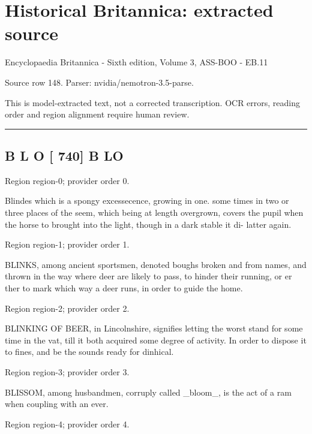 \documentclass[11pt]{article}
\begin{document}
\section*{Historical Britannica: extracted source}
Encyclopaedia Britannica - Sixth edition, Volume 3, ASS-BOO - EB.11\par
{\small Source row 148. Parser: nvidia/nemotron-3.5-parse.\par}
{\small This is model-extracted text, not a corrected transcription. OCR errors, reading order and region alignment require human review.\par}
\hrule\medskip
\subsection*{B L O [ 740] B LO}

{\scriptsize\color{gray} Region region-0; provider order 0.\par}
\medskip

Blindes which is a spongy excessecence, growing in one. some times in two or three places of the seem, which being at length overgrown, covers the pupil when the horse to brought into the light, though in a dark stable it di- latter again.
\par

{\scriptsize\color{gray} Region region-1; provider order 1.\par}
\medskip

BLINKS, among ancient sportsmen, denoted boughs broken and from names, and thrown in the way where deer are likely to pass, to hinder their running, or er ther to mark which way a deer runs, in order to guide the home.
\par

{\scriptsize\color{gray} Region region-2; provider order 2.\par}
\medskip

BLINKING OF BEER, in Lincolnshire, signifies letting the worst stand for some time in the vat, till it both acquired some degree of activity. In order to dispose it to fines, and be the sounds ready for dinhical.
\par

{\scriptsize\color{gray} Region region-3; provider order 3.\par}
\medskip

BLISSOM, among husbandmen, corruply called \_bloom\_, is the act of a ram when coupling with an ever.
\par

{\scriptsize\color{gray} Region region-4; provider order 4.\par}
\medskip
\end{document}

